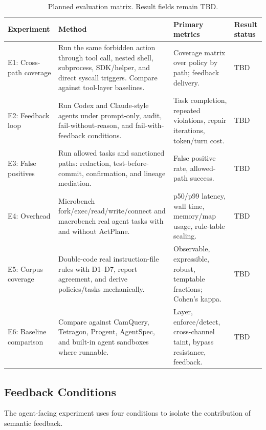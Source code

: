 \begin{table}[t]
\centering
\caption{Planned evaluation matrix. Result fields remain \textsc{TBD}.}
\begin{tabular}{p{}p{}p{}p{}}
\toprule
Experiment & Method & Primary metrics & Result status \\
\midrule
E1: Cross-path coverage &
Run the same forbidden action through tool call, nested shell, subprocess, SDK/helper, and direct syscall triggers. Compare against tool-layer baselines. &
Coverage matrix over policy by path; feedback delivery. &
\textsc{TBD} \\
\midrule
E2: Feedback loop &
Run Codex and Claude-style agents under prompt-only, audit, fail-without-reason, and fail-with-feedback conditions. &
Task completion, repeated violations, repair iterations, token/turn cost. &
\textsc{TBD} \\
\midrule
E3: False positives &
Run allowed tasks and sanctioned paths: redaction, test-before-commit, confirmation, and lineage mediation. &
False positive rate, allowed-path success. &
\textsc{TBD} \\
\midrule
E4: Overhead &
Microbench fork/exec/read/write/connect and macrobench real agent tasks with and without ActPlane. &
p50/p99 latency, wall time, memory/map usage, rule-table scaling. &
\textsc{TBD} \\
\midrule
E5: Corpus coverage &
Double-code real instruction-file rules with D1--D7, report agreement, and derive policies/tasks mechanically. &
Observable, expressible, robust, temptable fractions; Cohen's kappa. &
\textsc{TBD} \\
\midrule
E6: Baseline comparison &
Compare against CamQuery, Tetragon, Progent, AgentSpec, and built-in agent sandboxes where runnable. &
Layer, enforce/detect, cross-channel taint, bypass resistance, feedback. &
\textsc{TBD} \\
\bottomrule
\end{tabular}
\label{tab:eval-plan}
\end{table}

\subsection{Feedback Conditions}

The agent-facing experiment uses four conditions to isolate the contribution of
semantic feedback.

